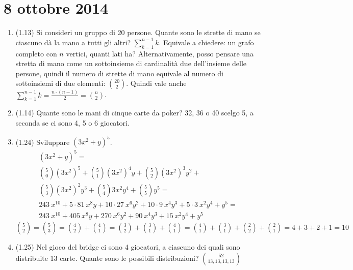 \section{8 ottobre 2014}

\begin{enumerate}
    \item (1.13) Si consideri un gruppo di 20 persone. Quante sono le strette di mano se ciascuno d\`a la mano a tutti gli altri? $\sum_{k=1}^{n-1} k$. Equivale a chiedere: un grafo completo con $n$ vertici, quanti lati ha? Alternativamente, posso pensare una stretta di mano come un sottoinsieme di cardinalit\`a due dell'insieme delle persone, quindi il numero di strette di mano equivale al numero di sottoinsiemi di due elementi: $\binom{20}{2}$. Quindi vale anche $\sum_{k=1}^{n-1} k = \frac{n \cdot (n-1)}{2} = \binom{n}{2}$.
    \item (1.14) Quante sono le mani di cinque carte da poker? 32, 36 o 40 scelgo 5, a seconda se ci sono 4, 5 o 6 giocatori.
    \item (1.24) Sviluppare $\left( 3x^2 + y \right)^5$.
        \begin{align*}
        \left( 3x^2 + y \right)^5 = \\
        \binom{5}{0} \left( 3x^2 \right)^5 +
        \binom{5}{1} \left( 3x^2 \right)^4 y +
        \binom{5}{2} \left( 3x^2 \right)^3 y^2 + \\
        \binom{5}{3} \left( 3x^2 \right)^2 y^3 +
        \binom{5}{4} 3x^2 y^4 +
        \binom{5}{5} y^5 = \\
        243 \ x^{10} +
        5 \cdot 81 \ x^8 y +
        10 \cdot 27 \ x^6 y^2 +
        10 \cdot 9 \ x^4 y^3 +
        5 \cdot 3 \ x^2 y^4 +
        y^5 = \\
        243 \ x^{10} +
        405 \ x^8 y +
        270 \ x^6 y^2 +
        90 \ x^4 y^3 +
        15 \ x^2 y^4 +
        y^5
        \end{align*}
        $\binom{5}{2} = \binom{5}{3} = \binom{4}{2} + \binom{4}{1} = \binom{3}{2} + \binom{3}{1} + \binom{4}{1} = \binom{4}{1} + \binom{3}{1} + \binom{2}{2} + \binom{2}{1} = 4 + 3 + 2 + 1 = 10 $
    \item (1.25) Nel gioco del bridge ci sono 4 giocatori, a ciascuno dei quali sono distribuite 13 carte. Quante sono le possibili distribuzioni? $\binom{52}{13,13,13,13}$
\end{enumerate}